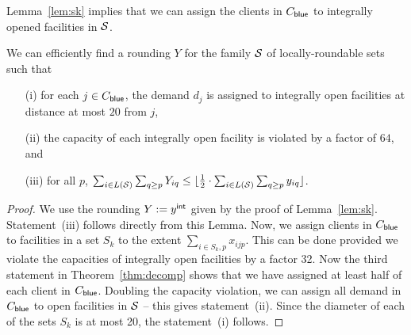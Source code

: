 \noindent
Lemma~\ref{lem:sk} implies that we can assign the clients in $C_{\mathsf{blue}}$ to integrally opened facilities in ${\cal S}$. 
\begin{corollary} \label{cor:combine-local}
We can efficiently find a rounding $Y$ for the family ${\cal S}$ of locally-roundable sets such that
\begin{enumerate}
\item[(i)] for each $j \in C_{\mathsf{blue}}$, the demand $d_j$ is assigned to integrally open facilities at distance at most $20$ from $j$,
\item[(ii)] the capacity of each integrally open facility is violated by a factor of $64$, and
\item[(iii)] for all $p$, $\sum_{i \in L({\cal S})} \sum_{q \geq p} Y_{iq} \leq \lfloor\frac12 \cdot \sum_{i \in L({\cal S})} \sum_{q \geq p} y_{iq}\rfloor$.
\end{enumerate}
\end{corollary}
\begin{proof}
We use the rounding $Y:=y^{{\mathsf{int}}}$ given by the proof of Lemma~\ref{lem:sk}.  Statement~(iii) follows directly from this Lemma. Now, we assign clients
in $C_{\mathsf{blue}}$ to facilities in  a set $S_k$ to the extent $\sum_{i \in S_k, p} x_{ijp}$. This can be done provided we violate the capacities of
integrally open facilities by a factor 32. Now the third statement in Theorem~\ref{thm:decomp} shows that we have assigned at least half of 
each client in $C_{\mathsf{blue}}$. Doubling the capacity violation, we can assign all demand in $C_{\mathsf{blue}}$ to open facilities in ${\cal S}$ -- this gives statement~(ii). 
Since the diameter of each 
of the sets $S_k$ is at most 20, the statement~(i) follows. 
\end{proof}

